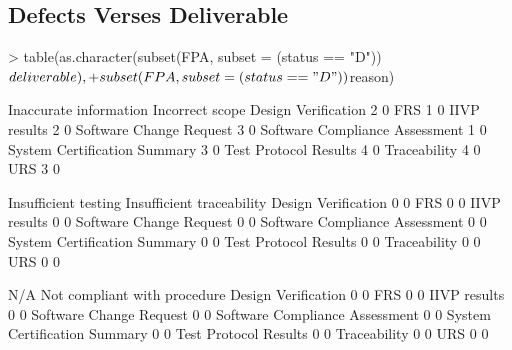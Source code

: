 \documentclass{article}
\begin{document}
\subsection{Defects Verses Deliverable}

\begin{Schunk}
\begin{Sinput}
> table(as.character(subset(FPA, subset = (status == "D"))$deliverable),
+       subset(FPA, subset = (status == "D"))$reason)
\end{Sinput}
\begin{Soutput}
                                 Inaccurate information Incorrect scope
  Design Verification                                 2               0
  FRS                                                 1               0
  IIVP results                                        2               0
  Software Change Request                             3               0
  Software Compliance Assessment                      1               0
  System Certification Summary                        3               0
  Test Protocol Results                               4               0
  Traceability                                        4               0
  URS                                                 3               0
                                
                                 Insufficient testing Insufficient traceability
  Design Verification                               0                         0
  FRS                                               0                         0
  IIVP results                                      0                         0
  Software Change Request                           0                         0
  Software Compliance Assessment                    0                         0
  System Certification Summary                      0                         0
  Test Protocol Results                             0                         0
  Traceability                                      0                         0
  URS                                               0                         0
                                
                                 N/A Not compliant with procedure
  Design Verification              0                            0
  FRS                              0                            0
  IIVP results                     0                            0
  Software Change Request          0                            0
  Software Compliance Assessment   0                            0
  System Certification Summary     0                            0
  Test Protocol Results            0                            0
  Traceability                     0                            0
  URS                              0                            0
                                

\end{Soutput}
\end{Schunk}
\end{document}
